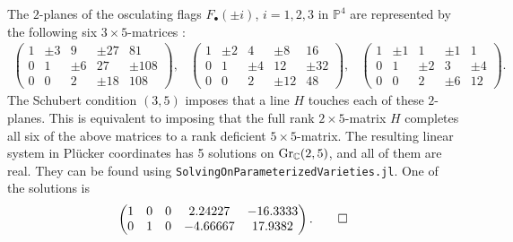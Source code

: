 \documentclass[12pt]{article}
\theoremstyle{definition}
\newenvironment{example}
  {\pushQED{\qed}\renewcommand{\qedsymbol}{$\diamond$}\examplex}
  {\popQED\endexamplex}
\theoremstyle{remark}
\begin{document}
\begin{example}[$k = 2, m = 5$]
The $2$-planes of the osculating flags $F_\bullet(\pm i)$, $i = 1, 2, 3$ in $\mathbb{P}^4$ are represented by the following six $3 \times 5$-matrices :
\[
\begin{matrix}
\begin{pmatrix}
    1 & \pm 3 & 9 & \pm27 &81\\
    0 & 1 & \pm6 & 27 & \pm 108 \\
    0 & 0 & 2 & \pm 18 & 108
\end{pmatrix}, &
\begin{pmatrix}
    1 & \pm 2 & 4 & \pm 8 &16\\
    0 & 1 & \pm 4 & 12 & \pm3 2\\
    0 & 0 & 2 & \pm 12 & 48
\end{pmatrix}, &
\begin{pmatrix}
    1 & \pm 1 & 1 & \pm 1 &1\\
    0 & 1 & \pm 2 & 3 & \pm4\\
    0 & 0 & 2 & \pm 6 & 12
\end{pmatrix}.
\end{matrix}
\]
The Schubert condition $(3,5)$ imposes that a line $H$ touches each of these $2$-planes. This is equivalent to imposing that the full rank $2 \times 5$-matrix $H$ completes all six of the above matrices to a rank deficient $5 \times 5$-matrix. The resulting linear system in Pl\"ucker coordinates has 5 solutions on ${\rm Gr}_{\mathbb{C}}(2,5)$, and all of them are real. They can be found using \texttt{SolvingOnParameterizedVarieties.jl}. 
One of the solutions is 
\[ \begin{pmatrix}
    1 & 0 & 0 & 2.24227 & -16.3333 \\
    0 & 1 & 0 & -4.66667 & 17.9382
\end{pmatrix}. \qedhere \]
\end{example}
\end{document}
